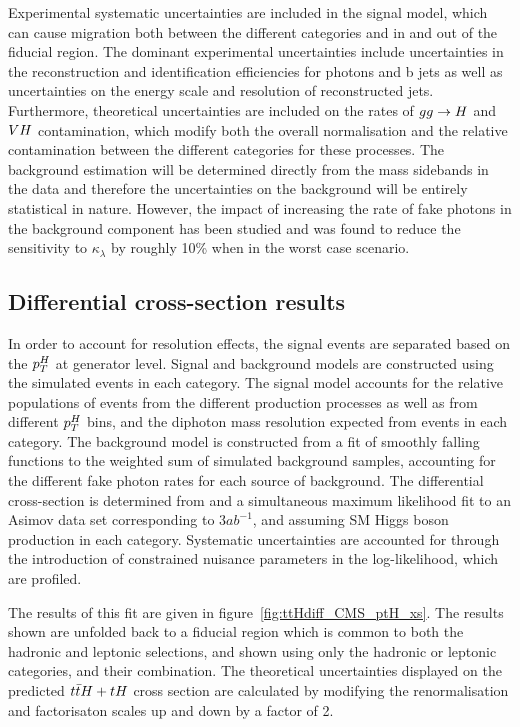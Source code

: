 Experimental systematic uncertainties are included in the signal model, which can cause migration both between the different categories and in and out of the fiducial region. The dominant experimental uncertainties include uncertainties in the reconstruction and 
identification efficiencies for photons and b jets as well as uncertainties on the energy scale and resolution of reconstructed jets. 
Furthermore, theoretical uncertainties are included on the rates of $gg\rightarrow H$ and $VH$ contamination, which modify both the overall normalisation and the relative contamination between the different categories for these processes. The background estimation will be determined directly from the mass sidebands in the data and therefore the uncertainties on the background will be entirely statistical in nature. However, the impact of increasing the rate of fake photons in the background component has been studied and was found to reduce the sensitivity to $\kappa_\lambda$ by roughly 10\% when in the worst case scenario.  

\subsection{Differential cross-section results}

In order to account for resolution effects, the signal events are separated based on the $p_{T}^{H}$ at generator level.   Signal and background models are constructed using the simulated events in each category. The signal model accounts for the relative populations of events from the different production processes as well as from different $p_{T}^{H}$ bins, and the diphoton mass resolution expected from events in each category. The background model is constructed from a fit of smoothly falling functions to the weighted sum of simulated background samples, accounting for the different fake photon rates for each source of background. The differential cross-section is determined from and a simultaneous maximum likelihood fit to an Asimov data set corresponding to $3ab^{-1}$, and assuming SM Higgs boson  production in each category.  Systematic uncertainties are accounted for through the introduction of constrained nuisance parameters in the log-likelihood, which are profiled. 

The results of this fit are given in figure~\ref{fig:ttHdiff_CMS_ptH_xs}. The results shown are unfolded back to a fiducial region which is common to both the hadronic and leptonic selections, and shown using only the hadronic or leptonic categories, and their combination. The theoretical uncertainties displayed on the predicted $t\bar{t}H+tH$ cross section are calculated by modifying the renormalisation and factorisaton scales up and down by a factor of 2.

